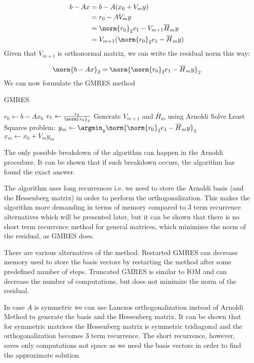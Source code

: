 \begin{align}
	b - Ax &= b - A(x_0 + V_my) \\
	       &= r_0 - AV_my \\
	       &= \norm{r_0}_2v_1 - V_{m+1}\overline{H}_my \\
	       &= V_{m+1}(\norm{r_0}_2e_1 - \overline{H}_my)
\end{align}
Given that $V_{m+1}$ is orthonormal matrix, we can write the residual norm this way:

\begin{equation}
	\norm{b - Ax}_2 = \norm{\norm{r_0}_2e_1 - \overline{H}_my}_2
\end{equation}
We can now formulate the GMRES method

\begin{algorithm}[H]
 \centering
 \caption{GMRES}\label{alg:GMRES}
 \begin{algorithmic}[1]
			\State $r_0 \gets b - Ax_0$
			\State $v_1 \gets \frac{r_0}{\norm{r_0}_2}$
			\State Generate $V_{m+1}$ and $\overline{H}_m$ using Arnoldi
			\State Solve Least Squares problem: $y_m \gets \argmin_{y}\norm{\norm{r_0}_2e_1 - \overline{H}_my}_2$
			\State $x_m \gets x_0 + V_my_m$
		\EndProcedure
 \end{algorithmic}
\end{algorithm}

The only possible breakdown of the algorithm can happen in the Arnoldi procedure. It can be shown \cite{saad-sparse} that if such breakdown occurs, the algorithm has found the exact answer.

The algorithm uses long recurrences i.e. we need to store the Arnoldi basis (and the Hessenberg matrix) in order to perform the orthogonalization. This makes the algorithm more demanding in terms of memory compared to 3 term recurrence alternatives which will be presented later, but it can be shown that there is no short term recurrence method for general matrices, which minimizes the norm of the residual, as GMRES does.

There are various alternatives of the method. Restarted GMRES can decrease memory used to store the basis vectors by restarting the method after some predefined number of steps. Truncated GMRES is similar to IOM and can decrease the number of computations, but does not minimize the norm of the residual.

In case $A$ is symmetric we can use Lanczos orthogonalization instead of Arnoldi Method to generate the basis and the Hessenberg matrix. It can be shown that for symmetric matrices the Hessenberg matrix is symmetric tridiagonal and the orthogonalization becomes 3 term recurrence. The short recurrence, however, saves only computations not space as we need the basis vectors in order to find the approximate solution.

